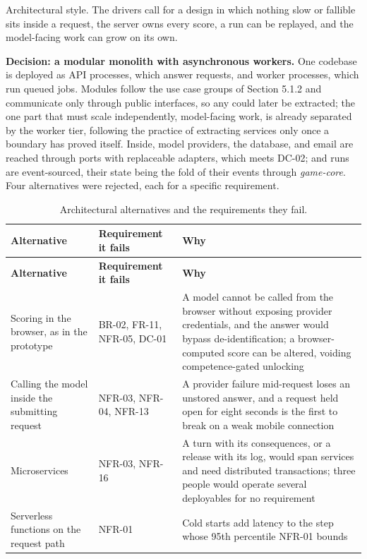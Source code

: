 Architectural style. The drivers call for a design in which nothing slow or fallible sits inside a request, the server owns every score, a run can be replayed, and the model-facing work can grow on its own.

\textbf{Decision: a modular monolith with asynchronous workers.} One codebase is deployed as API processes, which answer requests, and worker processes, which run queued jobs. Modules follow the use case groups of Section 5.1.2 and communicate only through public interfaces, so any could later be extracted; the one part that must scale independently, model-facing work, is already separated by the worker tier, following the practice of extracting services only once a boundary has proved itself\cite{r163}. Inside, model providers, the database, and email are reached through ports with replaceable adapters\cite{r150}, which meets DC-02; and runs are event-sourced\cite{r164}, their state being the fold of their events through \textit{game-core}. Four alternatives were rejected, each for a specific requirement.

{\small
\begin{longtable}{|>{\raggedright\arraybackslash}p{}|>{\raggedright\arraybackslash}p{}|>{\raggedright\arraybackslash}p{}|}
\caption{Architectural alternatives and the requirements they fail.} \\
\hline
\textbf{Alternative} & \textbf{Requirement it fails} & \textbf{Why} \\ \hline
\endfirsthead
\hline
\textbf{Alternative} & \textbf{Requirement it fails} & \textbf{Why} \\ \hline
\endhead
Scoring in the browser, as in the prototype & BR-02, FR-11, NFR-05, DC-01 & A model cannot be called from the browser without exposing provider credentials, and the answer would bypass de-identification; a browser-computed score can be altered, voiding competence-gated unlocking \\ \hline
Calling the model inside the submitting request & NFR-03, NFR-04, NFR-13 & A provider failure mid-request loses an unstored answer, and a request held open for eight seconds is the first to break on a weak mobile connection \\ \hline
Microservices & NFR-03, NFR-16 & A turn with its consequences, or a release with its log, would span services and need distributed transactions; three people would operate several deployables for no requirement \\ \hline
Serverless functions on the request path & NFR-01 & Cold starts add latency to the step whose 95th percentile NFR-01 bounds \\ \hline
\end{longtable}
}

